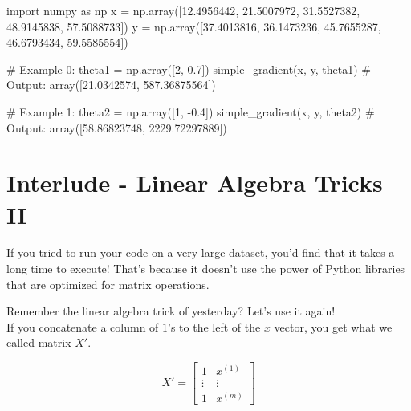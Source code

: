 \documentclass[]{article}
\newenvironment{Shaded}{\begin{snugshade}}{\end{snugshade}}
\newcommand{\CommentTok}[1]{\textcolor[rgb]{0.48,0.49,0.49}{#1}}
\newcommand{\DecValTok}[1]{\textcolor[rgb]{0.96,0.45,0.00}{#1}}
\newcommand{\FloatTok}[1]{\textcolor[rgb]{0.96,0.45,0.00}{#1}}
\newcommand{\ImportTok}[1]{\textcolor[rgb]{0.15,0.68,0.38}{#1}}
\newcommand{\NormalTok}[1]{\textcolor[rgb]{0.81,0.81,0.76}{#1}}
\newcommand{\OperatorTok}[1]{\textcolor[rgb]{0.81,0.81,0.76}{#1}}
\begin{document}
\begin{Shaded}
\begin{Highlighting}[]
\ImportTok{import}\NormalTok{ numpy }\ImportTok{as}\NormalTok{ np}
\NormalTok{x }\OperatorTok{=}\NormalTok{ np.array([}\FloatTok{12.4956442}\NormalTok{, }\FloatTok{21.5007972}\NormalTok{, }\FloatTok{31.5527382}\NormalTok{, }\FloatTok{48.9145838}\NormalTok{, }\FloatTok{57.5088733}\NormalTok{])}
\NormalTok{y }\OperatorTok{=}\NormalTok{ np.array([}\FloatTok{37.4013816}\NormalTok{, }\FloatTok{36.1473236}\NormalTok{, }\FloatTok{45.7655287}\NormalTok{, }\FloatTok{46.6793434}\NormalTok{, }\FloatTok{59.5585554}\NormalTok{])}

\CommentTok{# Example 0:}
\NormalTok{theta1 }\OperatorTok{=}\NormalTok{ np.array([}\DecValTok{2}\NormalTok{, }\FloatTok{0.7}\NormalTok{])}
\NormalTok{simple_gradient(x, y, theta1)}
\CommentTok{# Output:}
\NormalTok{array([}\FloatTok{21.0342574}\NormalTok{, }\FloatTok{587.36875564}\NormalTok{])}

\CommentTok{# Example 1:}
\NormalTok{theta2 }\OperatorTok{=}\NormalTok{ np.array([}\DecValTok{1}\NormalTok{, }\FloatTok{-0.4}\NormalTok{])}
\NormalTok{simple_gradient(x, y, theta2)}
\CommentTok{# Output:}
\NormalTok{array([}\FloatTok{58.86823748}\NormalTok{, }\FloatTok{2229.72297889}\NormalTok{])}
\end{Highlighting}
\end{Shaded}

\clearpage

\hypertarget{interlude---linear-algebra-tricks-ii-1}{%
\section{Interlude - Linear Algebra Tricks
II}\label{interlude---linear-algebra-tricks-ii-1}}

If you tried to run your code on a very large dataset, you'd find that
it takes a long time to execute! That's because it doesn't use the power
of Python libraries that are optimized for matrix operations.

Remember the linear algebra trick of yesterday? Let's use it again!\\
If you concatenate a column of \(1\)'s to the left of the \(x\) vector,
you get what we called matrix \(X'\).

\large

\[
X' = \begin{bmatrix} 1 & x^{(1)} \\ \vdots & \vdots \\ 1 & x^{(m)}\end{bmatrix}
\] \normalsize
\end{document}
